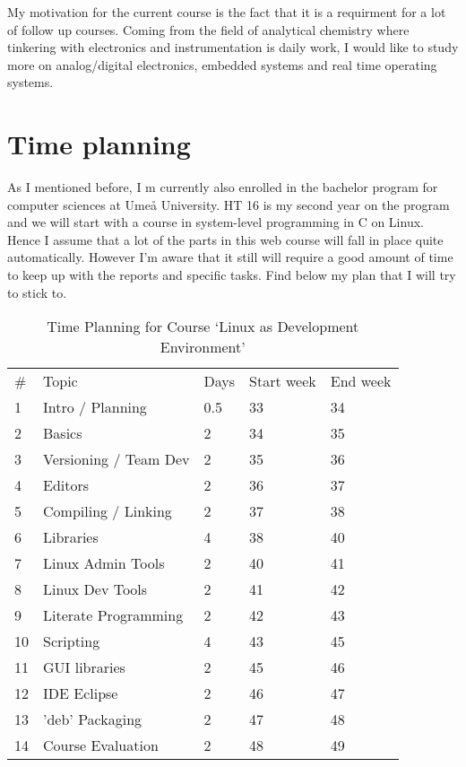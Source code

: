 \documentclass[a4paper,11pt,twoside]{article}
\begin{document}
My motivation for the current course is the fact that it is a requirment for a lot of follow up courses. Coming from the field of analytical chemistry where tinkering with electronics and instrumentation is daily work, I would like to study more on analog/digital electronics, embedded systems and real time operating systems.

\section{Time planning}
As I mentioned before, I m currently also enrolled in the bachelor program for computer sciences at Umeå University. HT 16 is my second year on the program and we will start with a course in system-level programming in C on Linux. Hence I assume that a lot of the parts in this web course will fall in place quite automatically. However I'm aware that it still will require a good amount of time to keep up with the reports and specific tasks. Find below my plan that I will try to stick to.


\begin{table}[]
  \centering
  \caption{Time Planning for Course `Linux as Development Environment'}
  \label{my-label}
  \begin{tabular}{lllll}
    \# & Topic                 & Days & Start week & End week \\ \cline{2-5}
    1  & Intro / Planning      & 0.5  & 33         & 34       \\
    2  & Basics                & 2    & 34         & 35       \\
    3  & Versioning / Team Dev & 2    & 35         & 36       \\
    4  & Editors               & 2    & 36         & 37       \\
    5  & Compiling / Linking   & 2    & 37         & 38       \\
    6  & Libraries             & 4    & 38         & 40       \\
    7  & Linux Admin Tools     & 2    & 40         & 41       \\
    8  & Linux Dev Tools       & 2    & 41         & 42       \\
    9  & Literate Programming  & 2    & 42         & 43       \\
    10 & Scripting             & 4    & 43         & 45       \\
    11 & GUI libraries         & 2    & 45         & 46       \\
    12 & IDE Eclipse           & 2    & 46         & 47       \\
    13 & 'deb' Packaging       & 2    & 47         & 48       \\
    14 & Course Evaluation     & 2    & 48         & 49
  \end{tabular}
  \end{table}




\end{document}
